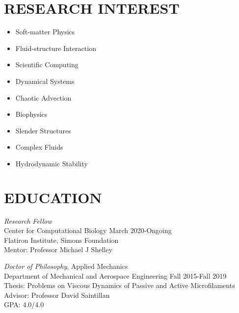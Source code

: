\documentclass[10pt]{res} %
\begin{document}
\begin{resume}


\section{{RESEARCH INTEREST}}

\vspace{8pt} %

\begin{multicols}{3}
    \begin{itemize}
    	\item[] Soft-matter Physics
    	\item[] Fluid-structure Interaction
    	\item[] Scientific Computing
    	\item[] Dynamical Systems
    	\item[] Chaotic Advection
    	\item[] Biophysics
    	\item[] Slender Structures
    	\item[] Complex Fluids
    	\item[] Hydrodynamic Stability
    \end{itemize}
\end{multicols}


\section{{EDUCATION}} 

\vspace{8pt} %
{\sl Research Fellow} \\
Center for Computational Biology  \hfill March 2020-Ongoing \\
Flatiron Institute, Simons Foundation  \\
Mentor: Professor Michael J Shelley 

{\sl Doctor of Philosophy}, 
Applied Mechanics \\ 
Department of Mechanical and Aerospace Engineering \hfill Fall 2015-Fall 2019 \\ 
Thesis: Problems on Viscous Dynamics of Passive and Active Microfilaments \\
Advisor: Professor David Saintillan \\
GPA: 4.0/4.0
 

\end{resume}
\end{document}
